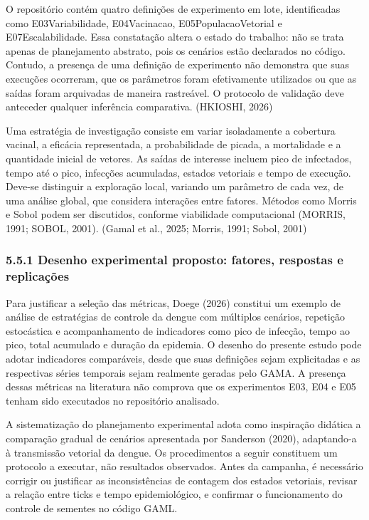 O repositório contém quatro definições de experimento em lote,
identificadas como E03Variabilidade, E04Vacinacao, E05PopulacaoVetorial
e E07Escalabilidade. Essa constatação altera o estado do trabalho: não
se trata apenas de planejamento abstrato, pois os cenários estão
declarados no código. Contudo, a presença de uma definição de
experimento não demonstra que suas execuções ocorreram, que os
parâmetros foram efetivamente utilizados ou que as saídas foram
arquivadas de maneira rastreável. O protocolo de validação deve
anteceder qualquer inferência comparativa. (HKIOSHI, 2026)

Uma estratégia de investigação consiste em variar isoladamente a
cobertura vacinal, a eficácia representada, a probabilidade de picada, a
mortalidade e a quantidade inicial de vetores. As saídas de interesse
incluem pico de infectados, tempo até o pico, infecções acumuladas,
estados vetoriais e tempo de execução. Deve-se distinguir a exploração
local, variando um parâmetro de cada vez, de uma análise global, que
considera interações entre fatores. Métodos como Morris e Sobol podem
ser discutidos, conforme viabilidade computacional (MORRIS, 1991; SOBOL,
2001). (Gamal et al., 2025; Morris, 1991; Sobol, 2001)

\subsubsection{5.5.1 Desenho experimental proposto: fatores, respostas e
replicações}\label{desenho-experimental-proposto-fatores-respostas-e-replicauxe7uxf5es}

Para justificar a seleção das métricas, Doege (2026) constitui um
exemplo de análise de estratégias de controle da dengue com múltiplos
cenários, repetição estocástica e acompanhamento de indicadores como
pico de infecção, tempo ao pico, total acumulado e duração da epidemia.
O desenho do presente estudo pode adotar indicadores comparáveis, desde
que suas definições sejam explicitadas e as respectivas séries temporais
sejam realmente geradas pelo GAMA. A presença dessas métricas na
literatura não comprova que os experimentos E03, E04 e E05 tenham sido
executados no repositório analisado.

A sistematização do planejamento experimental adota como inspiração
didática a comparação gradual de cenários apresentada por Sanderson
(2020), adaptando-a à transmissão vetorial da dengue. Os procedimentos a
seguir constituem um protocolo a executar, não resultados observados.
Antes da campanha, é necessário corrigir ou justificar as
inconsistências de contagem dos estados vetoriais, revisar a relação
entre ticks e tempo epidemiológico, e confirmar o funcionamento do
controle de sementes no código GAML.

